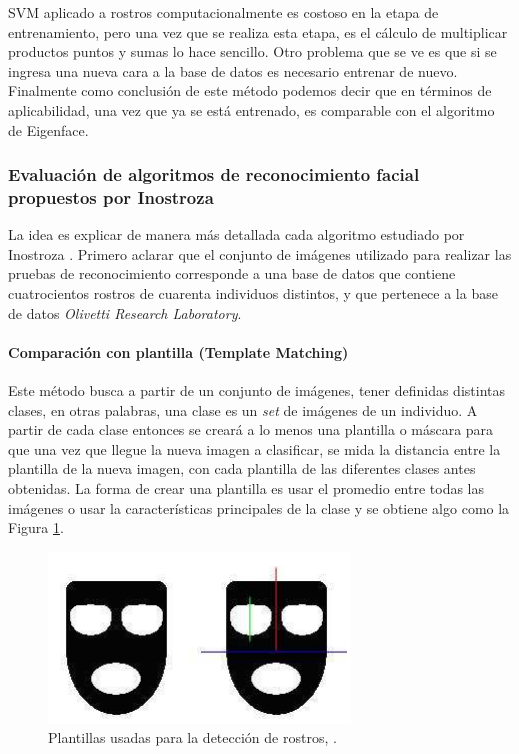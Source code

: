 \documentclass[letterpaper,12pt]{article}
\begin{document}
SVM aplicado a rostros computacionalmente es costoso en la etapa de entrenamiento, pero una vez que se realiza esta etapa, es el cálculo de multiplicar productos puntos y sumas lo hace sencillo. Otro problema que se ve es que si se ingresa una nueva cara a la base de datos es necesario entrenar de nuevo.\\
 Finalmente como conclusión de este método podemos decir que en términos de aplicabilidad, una vez que ya se está entrenado, es comparable con el algoritmo de Eigenface.

\newpage
\subsubsection{Evaluación de algoritmos de reconocimiento facial propuestos por Inostroza}

La idea es explicar de manera más detallada cada algoritmo estudiado por Inostroza \cite{ElectronicoUdeC}. Primero aclarar que el conjunto de imágenes utilizado para realizar las pruebas de reconocimiento corresponde a una base de datos que contiene cuatrocientos rostros de cuarenta individuos distintos, y que pertenece a la base de datos {\textit{Olivetti Research Laboratory}}.\\


\paragraph{Comparación con plantilla (Template Matching)}

Este método busca a partir de un conjunto de imágenes, tener definidas distintas  clases, en otras palabras, una clase es un \textit{set} de imágenes de un individuo. A partir de cada clase entonces se creará a lo menos una plantilla o máscara para que una vez que llegue la nueva imagen a clasificar, se mida la distancia entre la plantilla de la nueva imagen, con cada plantilla de las diferentes clases antes obtenidas. La forma de crear una plantilla es usar el promedio entre todas las imágenes o usar la características principales de la clase y se obtiene algo como la Figura \ref{fig:PantillaAS}.
\begin{figure}[H]
\centering
\includegraphics[scale=0.5]{Figs/Plantilla.png}
\caption{Plantillas usadas para la detección de rostros, \cite{AmirFa}.}
\label{fig:PantillaAS}
\end{figure}
\end{document}
